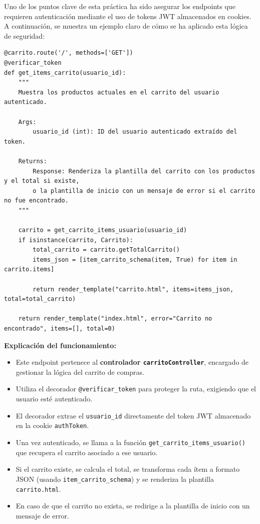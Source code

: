 \documentclass[10pt]{book}
\begin{document}
Uno de los puntos clave de esta práctica ha sido asegurar los endpoints que requieren autenticación mediante el uso de tokens JWT almacenados en cookies. A continuación, se muestra un ejemplo claro de cómo se ha aplicado esta lógica de seguridad:

\begin{lstlisting}[style=pythonclean, caption={Endpoint protegido para mostrar el carrito}]
@carrito.route('/', methods=['GET'])
@verificar_token
def get_items_carrito(usuario_id):
    """
    Muestra los productos actuales en el carrito del usuario autenticado.

    Args:
        usuario_id (int): ID del usuario autenticado extraído del token.

    Returns:
        Response: Renderiza la plantilla del carrito con los productos y el total si existe,
        o la plantilla de inicio con un mensaje de error si el carrito no fue encontrado.
    """

    carrito = get_carrito_items_usuario(usuario_id)
    if isinstance(carrito, Carrito):
        total_carrito = carrito.getTotalCarrito()
        items_json = [item_carrito_schema(item, True) for item in carrito.items]
        
        return render_template("carrito.html", items=items_json, total=total_carrito)

    return render_template("index.html", error="Carrito no encontrado", items=[], total=0)
\end{lstlisting}

\textbf{Explicación del funcionamiento:}
\begin{itemize}
    \item Este endpoint pertenece al \textbf{controlador \texttt{carritoController}}, encargado de gestionar la lógica del carrito de compras.
    \item Utiliza el decorador \texttt{@verificar\_token} para proteger la ruta, exigiendo que el usuario esté autenticado.
    \item El decorador extrae el \texttt{usuario\_id} directamente del token JWT almacenado en la cookie \texttt{authToken}.
    \item Una vez autenticado, se llama a la función \texttt{get\_carrito\_items\_usuario()} que recupera el carrito asociado a ese usuario.
    \item Si el carrito existe, se calcula el total, se transforma cada ítem a formato JSON (usando \texttt{item\_carrito\_schema}) y se renderiza la plantilla \texttt{carrito.html}.
    \item En caso de que el carrito no exista, se redirige a la plantilla de inicio con un mensaje de error.
\end{itemize}
\end{document}
